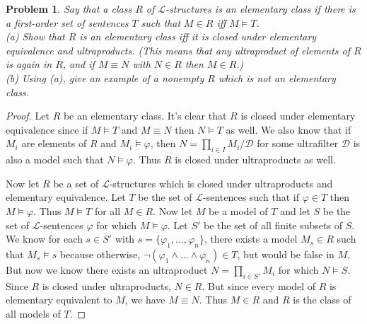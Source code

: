\documentclass{article}
\newtheorem{problem}{Problem}
\begin{document}
\begin{problem}
Say that a class $R$ of $\mathcal{L}$-structures is an \emph{elementary class} if there is a first-order set of sentences $T$ such that $M \in R$ iff $M \models T$.\\
(a) Show that $R$ is an elementary class iff it is closed under elementary equivalence and ultraproducts. (This means that any ultraproduct of elements of $R$ is again in $R$, and if $M \equiv N$ with $N \in R$ then $M \in R$.)\\
(b) Using (a), give an example of a nonempty $R$ which is not an elementary class.
\end{problem}
\begin{proof}
Let $R$ be an elementary class. It's clear that $R$ is closed under elementary equivalence since if $M \models T$ and $M \equiv N$ then $N \models T$ as well. We also know that if $M_i$ are elements of $R$ and $M_i \models \varphi$, then $N = \prod_{i \in I} M_i/\mathcal{D}$ for some ultrafilter $\mathcal{D}$ is also a model such that $N \models \varphi$. Thus $R$ is closed under ultraproducts as well.

Now let $R$ be a set of $\mathcal{L}$-structures which is closed under ultraproducts and elementary equivalence. Let $T$ be the set of $\mathcal{L}$-sentences such that if $\varphi \in T$ then $M \models \varphi$. Thus $M \models T$ for all $M \in R$. Now let $M$ be a model of $T$ and let $S$ be the set of $\mathcal{L}$-sentences $\varphi$ for which $M \models \varphi$. Let $S'$ be the set of all finite subsets of $S$. We know for each $s \in S'$ with $s = \{\varphi_1, \dots , \varphi_n\}$, there exists a model $M_s \in R$ such that $M_s \models s$ because otherwise, $\neg (\varphi_1 \wedge \dots \wedge \varphi_n) \in T$, but would be false in $M$. But now we know there exists an ultraproduct $N = \prod_{i \in S'} M_i$ for which $N \models S$. Since $R$ is closed under ultraproducts, $N \in R$. But since every model of $R$ is elementary equivalent to $M$, we have $M \equiv N$. Thus $M \in R$ and $R$ is the class of all models of $T$.
\end{proof}
\end{document}
